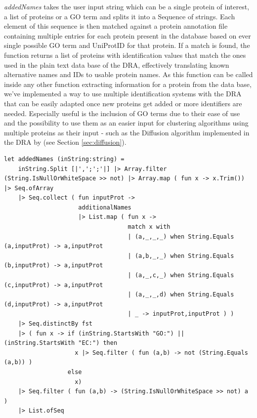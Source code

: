 \textit{addedNames} takes the user input string which can be a single protein of interest, a list of proteins or a GO term and splits it into a Sequence of strings. Each element of this sequence is then matched against a protein annotation file containing multiple entries for each protein present in the database based on ever single possible GO term and UniProtID for that protein. If a match is found, the function returns a list of proteins with identification values that match the ones used in the plain text data base of the DRA, effectively translating known alternative names and IDs to usable protein names. As this function can be called inside any other function extracting information for a protein from the data base, we've implemented a way to use multiple identification systems with the DRA that can be easily adapted once new proteins get added or more identifiers are needed. Especially useful is the inclusion of GO terms due to their ease of use and the possibility to use them as an easier input for clustering algorithms using multiple proteins as their input - such as the Diffusion algorithm implemented in the DRA by \cite{Menges.2018} (see Section \ref{sec:diffusion}).
\lstset{language=FSharp}
\begin{lstlisting}
let addedNames (inString:string) =
    inString.Split [|',';';'|] |> Array.filter (String.IsNullOrWhiteSpace >> not) |> Array.map ( fun x -> x.Trim()) |> Seq.ofArray
    |> Seq.collect ( fun inputProt -> 
                     additionalNames 
                     |> List.map ( fun x -> 
                                   match x with
                                   | (a,_,_,_) when String.Equals (a,inputProt) -> a,inputProt 
                                   | (a,b,_,_) when String.Equals (b,inputProt) -> a,inputProt 
                                   | (a,_,c,_) when String.Equals (c,inputProt) -> a,inputProt
                                   | (a,_,_,d) when String.Equals (d,inputProt) -> a,inputProt
                                   | _ -> inputProt,inputProt ) )
    |> Seq.distinctBy fst
    |> ( fun x -> if (inString.StartsWith "GO:") || (inString.StartsWith "EC:") then
                    x |> Seq.filter ( fun (a,b) -> not (String.Equals (a,b)) )
                  else
                    x)
    |> Seq.filter ( fun (a,b) -> (String.IsNullOrWhiteSpace >> not) a )
    |> List.ofSeq
\end{lstlisting}\newpage

